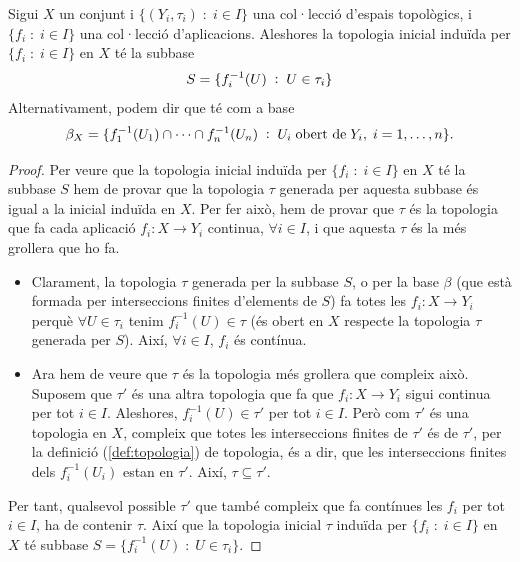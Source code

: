 \documentclass[../main.tex]{subfiles}
\begin{document}
\begin{ter}
\label{ter:topologiainicial} Sigui $X$ un conjunt i $\{(Y_i,\tau_i)\;:\;i\in I\}$ una col·lecció d'espais topològics, i $\{f_i\;:\;i\in I\}$ una col·lecció d'aplicacions. Aleshores la topologia inicial induïda per $\{f_i\;:\;i\in I\}$ en $X$ té la subbase
\begin{equation}
    \notag
    S = \{f_i^{-1}(U)\;:\;U\in\tau_i\}
\end{equation}
Alternativament, podem dir que té com a base
\begin{equation}
    \notag
    \beta_X = \{f_1^{-1}(U_1)\cap\cdots\cap f_n^{-1}(U_n)\;:\;U_i\;\text{obert de}\;Y_i,\;i=1,\ldots,n\} .
\end{equation}
\end{ter}
\begin{proof}
Per veure que la topologia inicial induïda per $\{f_i\;:\;i\in I\}$ en $X$ té la subbase $S$ hem de provar que la topologia $\tau$ generada per aquesta subbase és igual a la inicial induïda en $X$. Per fer això, hem de provar que $\tau$ és la topologia que fa cada aplicació $f_i:X\rightarrow Y_i$ continua, $\forall i\in I$, i que aquesta $\tau$ és la més grollera que ho fa.
\begin{itemize}
    \item Clarament, la topologia $\tau$ generada per la subbase $S$, o per la base $\beta$ (que està formada per interseccions finites d'elements de $S$) fa totes les $f_i:X\rightarrow Y_i$ perquè $\forall U\in \tau_i$ tenim $f_i^{-1}(U) \in \tau$ (és obert en $X$ respecte la topologia $\tau$ generada per $S$). Així, $\forall i\in I$, $f_i$ és contínua.
    \item Ara hem de veure que $\tau$ és la topologia més grollera que compleix això. Suposem que $\tau'$ és una altra topologia que fa que $f_i:X\rightarrow Y_i$ sigui continua per tot $i\in I$. Aleshores, $f_i^{-1}(U)\in \tau'$ per tot $i\in I$. Però com $\tau'$ és una topologia en $X$, compleix que totes les interseccions finites de $\tau'$ és de $\tau'$, per la definició (\ref{def:topologia}) de topologia, és a dir, que les interseccions finites dels $f_i^{-1}(U_i)$ estan en $\tau'$. Així, $\tau\subseteq\tau'$.
\end{itemize}
Per tant, qualsevol possible $\tau'$ que també compleix que fa contínues les $f_i$ per tot $i\in I$, ha de contenir $\tau$. Així que la topologia inicial $\tau$ induïda per $\{f_i\;:\;i\in I\}$ en $X$ té subbase $S = \{f_i^{-1}(U)\;:\;U\in\tau_i\}$.
\end{proof}
\end{document}

